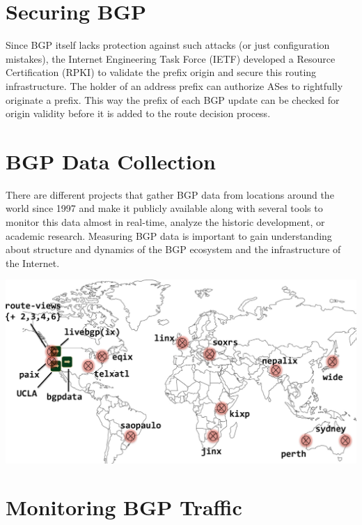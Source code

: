 \documentclass[a0,portrait,posterdraft]{a0poster}
\begin{document}
\begin{mybox}
\begin{multicols}{3}
\section*{Securing BGP}

Since BGP itself lacks protection against such attacks (or just
configuration mistakes), the Internet Engineering Task Force (IETF) developed a
Resource Certification (RPKI) to validate the prefix origin and secure this
routing infrastructure. The holder of an address prefix can authorize ASes to
rightfully originate a prefix. This way the prefix of each BGP update can be
checked for origin validity before it is added to the route decision process.

\section*{BGP Data Collection}

There are different projects that gather BGP data from locations around the
world since 1997 and make it publicly available along with several tools to
monitor this data almost in real-time, analyze the historic development, or
academic research. Measuring BGP data is important to gain understanding about
structure and dynamics of the BGP ecosystem and the infrastructure of the
Internet.

\vfill
\columnbreak

\begin{center}\vspace{1cm}
\includegraphics[width=0.9\linewidth,interpolate]{routeviews_33}
\end{center}\vspace{1cm}


\section*{Monitoring BGP Traffic}


\end{multicols}
\end{mybox}
\end{document}
